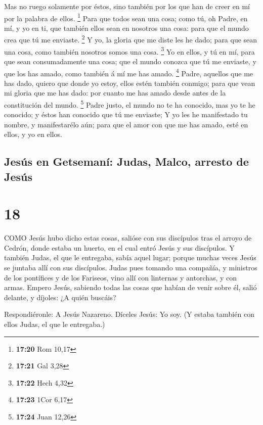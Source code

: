  Mas no ruego solamente por éstos, sino también por los que
han de creer en mí por la palabra de ellos. \footnote{\textbf{17:20} Rom
  10,17}  Para que todos sean una cosa; como tú, oh Padre,
en mí, y yo en ti, que también ellos sean en nosotros una cosa: para que
el mundo crea que tú me enviaste. \footnote{\textbf{17:21} Gal 3,28}
 Y yo, la gloria que me diste les he dado; para que sean
una cosa, como también nosotros somos una cosa. \footnote{\textbf{17:22}
  Hech 4,32}  Yo en ellos, y tú en mí, para que sean
consumadamente una cosa; que el mundo conozca que tú me enviaste, y que
los has amado, como también á mí me has amado. \footnote{\textbf{17:23}
  1Cor 6,17}  Padre, aquellos que me has dado, quiero que
donde yo estoy, ellos estén también conmigo; para que vean mi gloria que
me has dado: por cuanto me has amado desde antes de la constitución del
mundo. \footnote{\textbf{17:24} Juan 12,26}  Padre justo,
el mundo no te ha conocido, mas yo te he conocido; y éstos han conocido
que tú me enviaste;  Y yo les he manifestado tu nombre, y
manifestarélo aún; para que el amor con que me has amado, esté en ellos,
y yo en ellos.

\hypertarget{jesuxfas-en-getsemanuxed-judas-malco-arresto-de-jesuxfas}{%
\subsection{Jesús en Getsemaní: Judas, Malco, arresto de
Jesús}\label{jesuxfas-en-getsemanuxed-judas-malco-arresto-de-jesuxfas}}

\hypertarget{section-17}{%
\section{18}\label{section-17}}

 COMO Jesús hubo dicho estas cosas, salióse con sus
discípulos tras el arroyo de Cedrón, donde estaba un huerto, en el cual
entró Jesús y sus discípulos.  Y también Judas, el que le
entregaba, sabía aquel lugar; porque muchas veces Jesús se juntaba allí
con sus discípulos.  Judas pues tomando una compañía, y
ministros de los pontífices y de los Fariseos, vino allí con linternas y
antorchas, y con armas.  Empero Jesús, sabiendo todas las
cosas que habían de venir sobre él, salió delante, y díjoles: ¿A quién
buscáis?

 Respondiéronle: A Jesús Nazareno. Díceles Jesús: Yo soy. (Y
estaba también con ellos Judas, el que le entregaba.)


